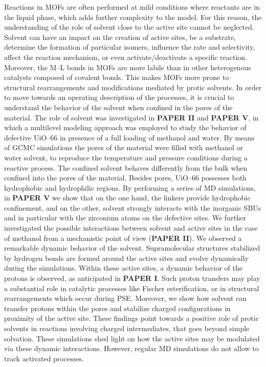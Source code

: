\npar
Reactions in MOFs are often performed at mild conditions where reactants are in the liquid phase, which adds further complexity to the model. For this reason, the understanding of the role of solvent close to the active site cannot be neglected. Solvent can have an impact on the creation of active sites, be a substrate, determine the formation of particular isomers, influence the rate and selectivity, affect the reaction mechanism, or even activate/deactivate a specific reaction. Moreover, the M--L bonds in MOFs are more labile than in other heterogenous catalysts composed of covalent bonds. This makes MOFs more prone to structural rearrangements and modifications mediated by protic solvents. In order to move towards an operating description of the processes, it is crucial to understand the behavior of the solvent when confined in the pores of the material. 
\npar
The role of solvent was investigated in \textbf{PAPER II} and \textbf{PAPER V}, in which a multilevel modeling approach was employed to study the behavior of defective UiO--66 in presence of a full loading of methanol and water. By means of GCMC simulations the pores of the material were filled with methanol or water solvent, to reproduce the temperature and pressure conditions during a reactive process. The confined solvent behaves differently from the bulk when confined into the pores of the material. Besides pores, UiO--66 possesses both hydrophobic and hydrophilic regions. By performing a series of MD simulations, in \textbf{PAPER V}  we show that on the one hand, the linkers provide hydrophobic confinement, and on the other, solvent strongly interacts with the inorganic SBUs and in particular with the zirconium atoms on the defective sites. 
\npar
We further investigated the possible interactions between solvent and active sites in the case of methanol from a mechanistic point of view (\textbf{PAPER II}). We observed a remarkable dynamic behavior of the solvent. Supramolecular structures stabilized by hydrogen bonds are formed around the active sites and evolve dynamically during the simulations. Within these active sites, a dynamic behavior of the protons is observed, as anticipated in \textbf{PAPER I}. Such proton transfers may play a substantial role in catalytic processes like Fischer esterification, or in structural rearrangements which occur during PSE. Moreover, we show how solvent can transfer protons within the pores and stabilize charged configurations in proximity of the active site. These findings point towards a positive role of protic solvents in reactions involving charged intermediates, that goes beyond simple solvation. These simulations shed light on how the active sites may be modulated via these dynamic interactions. However, regular MD simulations do not allow to track activated processes.
